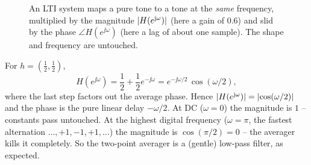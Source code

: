 \begin{figure}[H]
\centering
{}
\caption{An LTI system maps a pure tone to a tone at the \emph{same} frequency,
multiplied by the magnitude $\lvert H(e^{\mathrm{j}\omega})\rvert$ (here a gain of $0.6$) and
slid by the phase $\angle H(e^{\jj\omega})$ (here a lag of about one sample).
The shape and frequency are untouched.}
\label{ch12:fig-eigen-sinusoid}
\end{figure}

\begin{example}
\label{ch12:freq-averager}
For $h=(\tfrac12,\tfrac12)$,
\[
  H(e^{\jj\omega}) = \frac{1}{2} + \frac{1}{2} e^{-\jj\omega}
  = e^{-\jj\omega/2}\,\cos(\omega/2),
\]
where the last step factors out the average phase. Hence
$\lvert H(e^{\mathrm{j}\omega})\rvert=\lvert\cos(\omega/2)\rvert$ and the phase is the pure linear
delay $-\omega/2$. At DC ($\omega=0$) the magnitude is $1$ -- constants pass
untouched. At the highest digital frequency ($\omega=\pi$, the fastest
alternation $\dots,+1,-1,+1,\dots$) the magnitude is $\cos(\pi/2)=0$ -- the
averager kills it completely. So the two-point averager is a (gentle) low-pass
filter, as expected.
\end{example}

